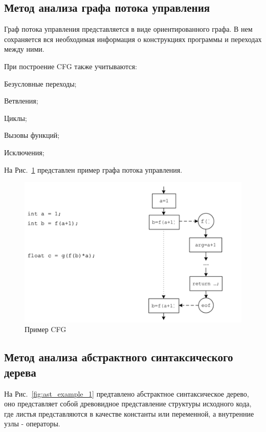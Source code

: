 \subsection{Метод анализа графа потока управления}

Граф потока управления представляется в виде ориентированного графа. В нем сохраняется вся необходимая информация о конструкциях программы и переходах между ними.

При построение CFG также учитываются:
%
\begin{itemize*}
\item Безусловные переходы;
\item Ветвления;
\item Циклы;
\item Вызовы функций;
\item Исключения;
\end{itemize*}
%

На Рис.~\ref{fig:cfg_example_1} представлен пример графа потока управления.

\begin{figure}[htbp]
\centering
\includegraphics[width=\textwidth]{fig/cfg_example_1.png}
\caption{Пример CFG}%
\label{fig:cfg_example_1}
\end{figure}

\subsection{Метод анализа абстрактного синтаксического дерева}

На Рис.~\ref{fig:ast_example_1} предтавлено абстрактное синтаксическое дерево, оно представляет собой древовидное представление структуры исходного кода, где листья представляются в качестве константы или переменной, а внутренние узлы - операторы.

